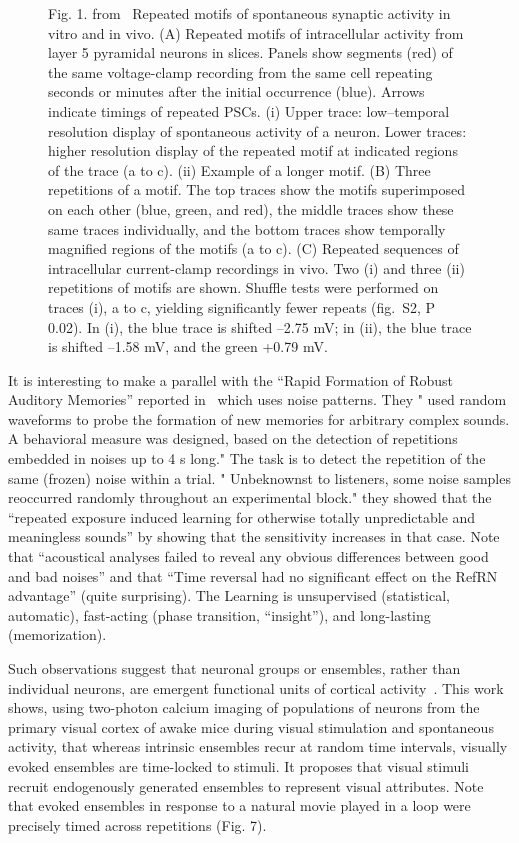 \documentclass[brainsci, %
               review,submit,pdftex,moreauthors]{Definitions/mdpi}
\begin{document}
\begin{figure}
\centering
\caption{Fig. 1. from~\citep{ikegaya_synfire_2004} Repeated motifs of spontaneous synaptic activity in vitro and in vivo. (A) Repeated motifs of intracellular activity from layer 5 pyramidal neurons in slices. Panels show segments (red) of the same voltage-clamp recording from the same cell repeating seconds or minutes after the initial occurrence (blue). Arrows indicate timings of repeated PSCs. (i) Upper trace: low--temporal resolution display of spontaneous activity of a neuron. Lower traces: higher resolution display of the repeated motif at indicated regions of the trace (a to c). (ii) Example of a longer motif. (B) Three repetitions of a motif. The top traces show the motifs superimposed on each other (blue, green, and red), the middle traces show these same traces individually, and the bottom traces show temporally magnified regions of the motifs (a to c). (C) Repeated sequences of intracellular current-clamp recordings in vivo. Two (i) and three (ii) repetitions of motifs are shown. Shuffle tests were performed on traces (i), a to c, yielding significantly fewer repeats (fig.~S2, P  0.02). In (i), the blue trace is shifted --2.75 mV; in (ii), the blue trace is shifted --1.58 mV, and the green +0.79 mV.}\label{fig:Ikegaya2004}
\end{figure}

It is interesting to make a parallel with the ``Rapid Formation of Robust Auditory Memories'' reported in~\citep{agus_rapid_2010} which uses noise patterns. They " used random waveforms to probe the formation of new memories for arbitrary complex sounds. A behavioral measure was designed, based on the detection of repetitions embedded in noises up to 4 s long." The task is to detect the repetition of the same (frozen) noise within a trial. " Unbeknownst to listeners, some noise samples reoccurred randomly throughout an experimental block." they showed that the ``repeated exposure induced learning for otherwise totally unpredictable and meaningless sounds'' by showing that the sensitivity increases in that case. Note that ``acoustical analyses failed to reveal any obvious differences between good and bad noises'' and that ``Time reversal had no significant effect on the RefRN advantage'' (quite surprising). The Learning is unsupervised (statistical, automatic), fast-acting (phase transition, ``insight''), and long-lasting (memorization).

Such observations suggest that neuronal groups or ensembles, rather than individual neurons, are emergent functional units of cortical activity~\citep{miller_visual_2014}. This work shows, using two-photon calcium imaging of populations of neurons from the primary visual cortex of awake mice during visual stimulation and spontaneous activity, that whereas intrinsic ensembles recur at random time intervals, visually evoked ensembles are time-locked to stimuli. It proposes that visual stimuli recruit endogenously generated ensembles to represent visual attributes. Note that evoked ensembles in response to a natural movie played in a loop were precisely timed across repetitions (Fig. 7).
%
\end{document}

